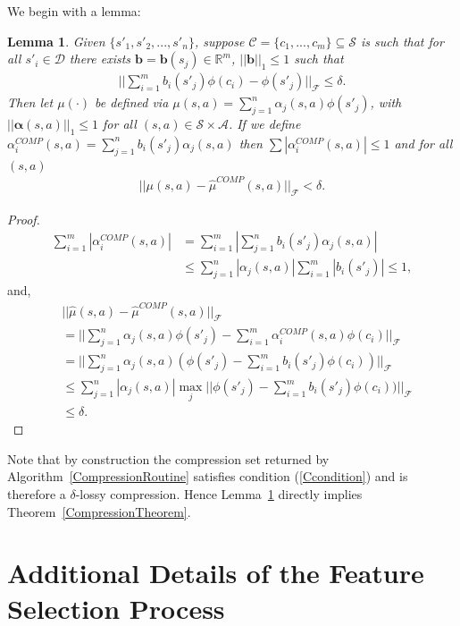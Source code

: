 \documentclass[letterpaper]{article}
\newtheorem{lemma}[theorem]{Lemma}
\newcommand{\cD}{{\mathcal D}}
\newcommand{\cC}{{\mathcal C}}
\newcommand{\cF}{{\mathcal F}}
\newcommand{\cA}{{\mathcal A}}
\newcommand{\cS}{{\mathcal S}}
\newcommand{\balpha}{{\bm \alpha}}
\newcommand{\R}{{\mathbb R}}
\newcommand{\nn}{\nonumber}
\begin{document}
We begin with a lemma:

\begin{lemma}\label{COMPlemma} Given $\{s'_1,s'_2,...,s'_n\}$, suppose $\cC = \{ c_1,...,c_m \}\subseteq \cS$ is such that for all $s'_i\in\cD$ there exists ${\bm b} = {\bm b}(s_j)\in\R^m$, $||\bm b||_1\le 1$ such that
\begin{align}
||\sum_{i=1}^m b_i(s'_j) \phi(c_i) - \phi(s'_j)||_{\cF} \le \delta. \label{Ccondition}
\end{align}
Then let $\mu(\cdot)$ be defined via $\mu(s,a) = \sum_{j=1}^n \alpha_j(s,a) \phi(s'_j)$, with $||\balpha(s,a)||_1\le 1$ for all $(s,a)\in\cS\times\cA$. 
If we define $\alpha^{COMP}_i(s,a)=\sum_{j=1}^n b_i(s'_j) \alpha_j(s,a)$ then $\sum |\alpha^{COMP}_i(s,a)|\le 1$ and for all $(s,a)$
\begin{align}
||\mu(s,a) - \hat\mu^{COMP}(s,a)||_\cF < \delta. \nn
\end{align}
\end{lemma}

\begin{proof}
\begin{align}
\sum_{i=1}^m |\alpha^{COMP}_i(s,a)| & = \sum_{i=1}^m |\sum_{j=1}^n b_i(s'_j) \alpha_j(s,a)| \nn\\
&\le \sum_{j=1}^n|\alpha_j(s,a)| \sum_{i=1}^m  |b_i(s'_j)| \le 1, \nn
\end{align}
and,
\begin{align}
&||\hat\mu(s,a) - \hat\mu^{COMP}(s,a)||_\cF \nn\\
&= || \sum_{j=1}^n \alpha_j(s,a) \phi(s'_j) - \sum_{i=1}^m \alpha^{COMP}_i(s,a) \phi(c_i) ||_\cF \nn\\
&= || \sum_{j=1}^n \alpha_j(s,a)( \phi(s'_j) - \sum_{i=1}^m b_i(s'_j)  \phi(c_i)) ||_\cF \nn\\
&\le \sum_{j=1}^n |\alpha_j(s,a)| \max_j || \phi(s'_j) - \sum_{i=1}^m b_i(s'_j)  \phi(c_i)) ||_\cF\nn\\
&\le \delta.\nn
\end{align}
\end{proof}

Note that by construction the compression set returned by Algorithm~\ref{CompressionRoutine} satisfies condition (\ref{Ccondition}) and is therefore a $\delta$-lossy compression. Hence Lemma~\ref{COMPlemma} directly implies Theorem~\ref{CompressionTheorem}.

\section{Additional Details of the Feature Selection Process}\label{MatchingPursuit}
\end{document}
